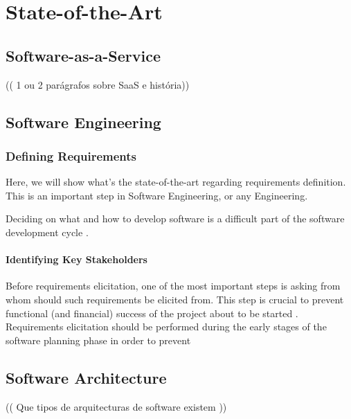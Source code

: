 \chapter{State-of-the-Art}\label{state-of-the-art}


\section{Software-as-a-Service}\label{state-of-the-art:s:software-as-a-service}
(( 1 ou 2 parágrafos sobre SaaS e história))

\section{Software Engineering}\label{state-of-the-art:s:software-engineering}

\subsection{Defining Requirements}\label{state-of-the-art:ss:defining-requirements}

Here, we will show what's the state-of-the-art regarding requirements definition. This is an important step in Software Engineering, or any Engineering. 

Deciding on what and how to develop software is a difficult part of the software development cycle \parencite{pacheco_garcía_reyes_2018}.

\subsubsection{Identifying Key Stakeholders}\label{state-of-the-art:sss:identifying-key-stakeholders}

Before requirements elicitation, one of the most important steps is asking from whom should such requirements be elicited from. This step is crucial to prevent functional (and financial) success of the project about to be started \parencite{lewellen_2020}. Requirements elicitation should be performed during the early stages of the software planning phase in order to prevent



\section{Software Architecture}\label{state-of-the-art:s:software-architecture}

(( Que tipos de arquitecturas de software existem ))

